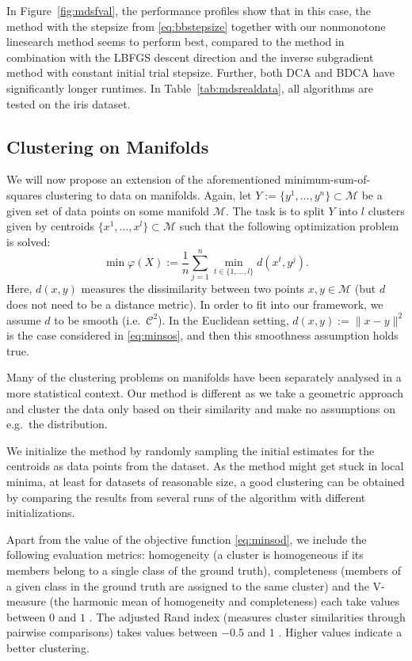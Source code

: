 \documentclass[a4paper, 12pt]{article}
\numberwithin{equation}{section}
\theoremstyle{bolddef}
\theoremstyle{definition}
\theoremstyle{boldplain}
\begin{document}
In Figure~\ref{fig:mdsfval}, the performance profiles show that in this case, the method with the stepsize from \eqref{eq:bbstepsize} together with our nonmonotone linesearch method seems to perform best, compared to the method in combination with the LBFGS descent direction and the inverse subgradient method with constant initial trial stepsize. Further, both DCA and BDCA have significantly longer runtimes. In Table~\ref{tab:mdsrealdata}, all algorithms are tested on the iris dataset.

\subsection{Clustering on Manifolds}

We will now propose an extension of the aforementioned minimum-sum-of-squares clustering to data on manifolds. Again, let $Y:= \{y^1, \dots, y^n\} \subset \mathcal{M}$ be a given set of data points on some manifold $\mathcal{M}$. The task is to split $Y$ into $l$ clusters given by centroids $\{x^1, \dots, x^l\} \subset \mathcal{M}$ such that the following optimization problem is solved:
\begin{equation}\label{eq:minsod}
	\min \varphi(X) := \frac{1}{n} \sum_{j = 1}^n \min_{t \in \{1, \dots, l\}} d(x^t, y^j).
\end{equation}
Here, $d(x, y)$ measures the dissimilarity between two points $x, y \in \mathcal{M}$ (but $d$ does not need to be a distance metric). In order to fit into our framework, we assume $d$ to be smooth (i.e.\ $\mathcal{C}^2$). In the Euclidean setting, $d(x, y) := \|x-y\|^2$ is the case considered in \eqref{eq:minsos}, and then this smoothness assumption holds true. 

Many of the clustering problems on manifolds have been separately analysed in a more statistical context. Our method is different as we take a geometric approach and cluster the data only based on their similarity and make no assumptions on e.g.\ the distribution.

We initialize the method by randomly sampling the initial estimates for the centroids as data points from the dataset. As the method might get stuck in local minima, at least for datasets of reasonable size, a good clustering can be obtained by comparing the results from several runs of the algorithm with different initializations.

Apart from the value of the objective function \eqref{eq:minsod}, we include the following evaluation metrics: homogeneity (a cluster is homogeneous if its members belong to a single class of the ground truth), completeness (members of a given class in the ground truth are assigned to the same cluster) and the V-measure (the harmonic mean of homogeneity and completeness) each take values between $0$ and $1$ \cite{Rosenberg2007}. The adjusted Rand index (measures cluster similarities through pairwise comparisons) takes values between $-0.5$ and $1$ \cite{Rand1971, Hubert1985}. Higher values indicate a better clustering.
\end{document}
